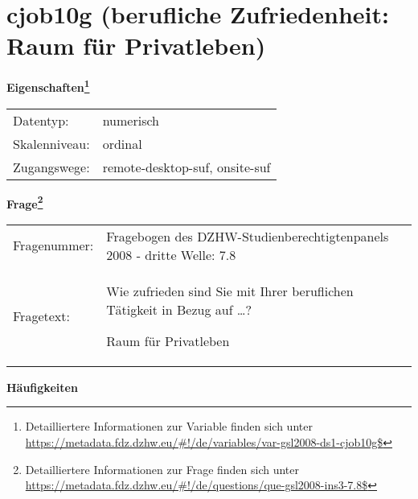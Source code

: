 
    \setcounter{footnote}{0}

    \vspace*{-1.8cm}
	\section{cjob10g (berufliche Zufriedenheit: Raum für Privatleben)}
	\label{section:cjob10g}



    \vspace*{0.5cm}
    \noindent\textbf{Eigenschaften\footnote{Detailliertere Informationen zur Variable finden sich unter
		\url{https://metadata.fdz.dzhw.eu/\#!/de/variables/var-gsl2008-ds1-cjob10g$}}}\\
	\begin{tabularx}{\hsize}{@{}lX}
	Datentyp: & numerisch \\
	Skalenniveau: & ordinal \\
	Zugangswege: &
	  remote-desktop-suf, 
	  onsite-suf
 \\
    \end{tabularx}



				\vspace*{0.5cm}
                \noindent\textbf{Frage\footnote{Detailliertere Informationen zur Frage finden sich unter
		              \url{https://metadata.fdz.dzhw.eu/\#!/de/questions/que-gsl2008-ins3-7.8$}}}\\
				\begin{tabularx}{\hsize}{@{}lX}
					Fragenummer: &
					  Fragebogen des DZHW-Studienberechtigtenpanels 2008 - dritte Welle:
					  7.8
 \\
					Fragetext: & Wie zufrieden sind Sie mit Ihrer beruflichen Tätigkeit in Bezug auf …?\par  Raum für Privatleben \\
				\end{tabularx}





        		\vspace*{0.5cm}
                \noindent\textbf{Häufigkeiten}

